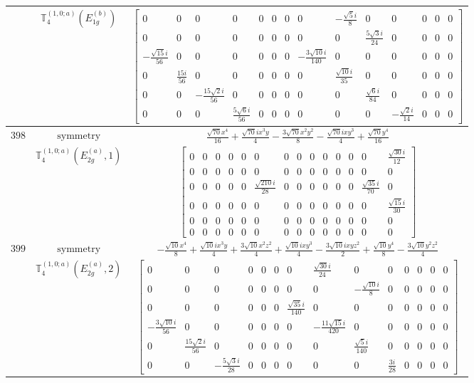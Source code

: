 \documentclass[fleqn,8pt,landscape]{jsarticle}
\begin{document}
\begin{longtable}{ccc}
$  $ & $ \mathbb{T}_{4}^{(1,0;a)}(E_{1g}^{(b)}) $ & $ \begin{bmatrix} 0 & 0 & 0 & 0 & 0 & 0 & 0 & 0 & - \frac{\sqrt{5} i}{8} & 0 & 0 & 0 & 0 & 0 \\ 0 & 0 & 0 & 0 & 0 & 0 & 0 & 0 & 0 & \frac{5 \sqrt{3} i}{24} & 0 & 0 & 0 & 0 \\ - \frac{\sqrt{15} i}{56} & 0 & 0 & 0 & 0 & 0 & 0 & - \frac{3 \sqrt{10} i}{140} & 0 & 0 & 0 & 0 & 0 & 0 \\ 0 & \frac{15 i}{56} & 0 & 0 & 0 & 0 & 0 & 0 & \frac{\sqrt{10} i}{35} & 0 & 0 & 0 & 0 & 0 \\ 0 & 0 & - \frac{15 \sqrt{2} i}{56} & 0 & 0 & 0 & 0 & 0 & 0 & \frac{\sqrt{6} i}{84} & 0 & 0 & 0 & 0 \\ 0 & 0 & 0 & \frac{5 \sqrt{6} i}{56} & 0 & 0 & 0 & 0 & 0 & 0 & - \frac{\sqrt{2} i}{14} & 0 & 0 & 0 \end{bmatrix} $ \\ \hline
$ 398 $ & $ \text{symmetry} $ & $ \frac{\sqrt{70} x^{4}}{16} + \frac{\sqrt{70} i x^{3} y}{4} - \frac{3 \sqrt{70} x^{2} y^{2}}{8} - \frac{\sqrt{70} i x y^{3}}{4} + \frac{\sqrt{70} y^{4}}{16} $ \\
$  $ & $ \mathbb{T}_{4}^{(1,0;a)}(E_{2g}^{(a)},1) $ & $ \begin{bmatrix} 0 & 0 & 0 & 0 & 0 & 0 & 0 & 0 & 0 & 0 & 0 & 0 & 0 & \frac{\sqrt{30} i}{12} \\ 0 & 0 & 0 & 0 & 0 & 0 & 0 & 0 & 0 & 0 & 0 & 0 & 0 & 0 \\ 0 & 0 & 0 & 0 & 0 & \frac{\sqrt{210} i}{28} & 0 & 0 & 0 & 0 & 0 & 0 & \frac{\sqrt{35} i}{70} & 0 \\ 0 & 0 & 0 & 0 & 0 & 0 & 0 & 0 & 0 & 0 & 0 & 0 & 0 & \frac{\sqrt{15} i}{30} \\ 0 & 0 & 0 & 0 & 0 & 0 & 0 & 0 & 0 & 0 & 0 & 0 & 0 & 0 \\ 0 & 0 & 0 & 0 & 0 & 0 & 0 & 0 & 0 & 0 & 0 & 0 & 0 & 0 \end{bmatrix} $ \\ \hline
$ 399 $ & $ \text{symmetry} $ & $ - \frac{\sqrt{10} x^{4}}{8} + \frac{\sqrt{10} i x^{3} y}{4} + \frac{3 \sqrt{10} x^{2} z^{2}}{4} + \frac{\sqrt{10} i x y^{3}}{4} - \frac{3 \sqrt{10} i x y z^{2}}{2} + \frac{\sqrt{10} y^{4}}{8} - \frac{3 \sqrt{10} y^{2} z^{2}}{4} $ \\
$  $ & $ \mathbb{T}_{4}^{(1,0;a)}(E_{2g}^{(a)},2) $ & $ \begin{bmatrix} 0 & 0 & 0 & 0 & 0 & 0 & 0 & \frac{\sqrt{30} i}{24} & 0 & 0 & 0 & 0 & 0 & 0 \\ 0 & 0 & 0 & 0 & 0 & 0 & 0 & 0 & - \frac{\sqrt{10} i}{8} & 0 & 0 & 0 & 0 & 0 \\ 0 & 0 & 0 & 0 & 0 & 0 & \frac{\sqrt{35} i}{140} & 0 & 0 & 0 & 0 & 0 & 0 & 0 \\ - \frac{3 \sqrt{10} i}{56} & 0 & 0 & 0 & 0 & 0 & 0 & - \frac{11 \sqrt{15} i}{420} & 0 & 0 & 0 & 0 & 0 & 0 \\ 0 & \frac{15 \sqrt{2} i}{56} & 0 & 0 & 0 & 0 & 0 & 0 & \frac{\sqrt{5} i}{140} & 0 & 0 & 0 & 0 & 0 \\ 0 & 0 & - \frac{5 \sqrt{3} i}{28} & 0 & 0 & 0 & 0 & 0 & 0 & \frac{3 i}{28} & 0 & 0 & 0 & 0 \end{bmatrix} $ \\ \hline

\end{longtable}
\end{document}
